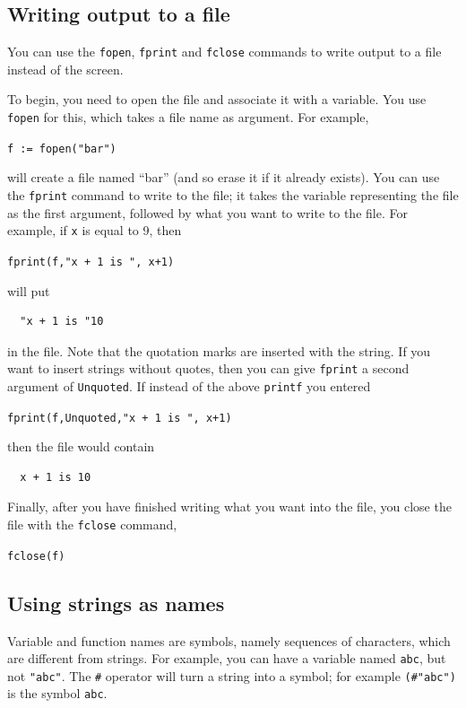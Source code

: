 \documentclass[a4paper,11pt]{book}
\begin{document}
\subsection{Writing output to a file}

You can use the \texttt{fopen},
\texttt{fprint} and \texttt{fclose}
commands to write output to a file instead of the screen.

To begin, you need to open the file and associate it with a variable.
You use \texttt{fopen} for this, which takes a file name as argument.
For example,
\begin{center}
  {\tt f := fopen("bar")}
\end{center}
will create a file named ``bar'' (and so erase it if it already
exists).  You can use the \texttt{fprint} command to write to the
file; it takes the variable representing the file as the first
argument, followed by what you want to write to the file.  For
example, if \texttt{x} is equal to 9, then
\begin{center}
  {\tt fprint(f,"x + 1 is ", x+1)}
\end{center}
will put
\begin{verbatim}
  "x + 1 is "10
\end{verbatim}
in the file.  Note that the quotation marks are inserted with the
string.  If you want to insert strings without quotes, then you can
give \texttt{fprint} a second argument of
\texttt{Unquoted}.  If instead of
the above \texttt{printf} you entered
\begin{center}
  {\tt fprint(f,Unquoted,"x + 1 is ", x+1)}
\end{center}
then the file would contain
\begin{verbatim}
  x + 1 is 10
\end{verbatim}
Finally, after you have finished writing what you want into the file,
you close the file with the \texttt{fclose} command,
\begin{center}
  {\tt fclose(f)}
\end{center}

\subsection{Using strings as names}

Variable and function names are symbols, namely sequences of characters, which are
different from strings.  For example, you can have a variable named \texttt{abc}, but
not \texttt{"abc"}.  The \texttt{\#\index{\#}} operator will turn a
string into a symbol; for example \texttt{(\#"abc")} is the symbol
\texttt{abc}.
\end{document}

